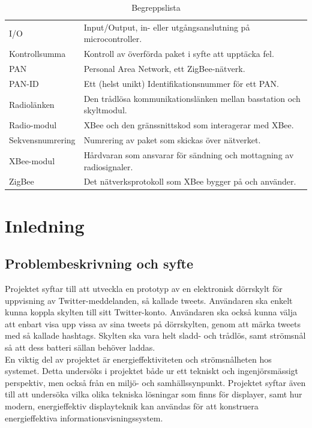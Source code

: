 \documentclass[a4paper,11pt]{article}
\begin{document}
\begin{table}[h]
\begin{tabular}{|l|l|}
I/O & Input/Output, in- eller utgångsanslutning på microcontroller.\\
Kontrollsumma & Kontroll av överförda paket i syfte att upptäcka fel.\\
PAN & Personal Area Network, ett ZigBee-nätverk.\\
PAN-ID & Ett (helst unikt) Identifikationsnummer för ett PAN.\\
Radiolänken & Den trådlösa kommunikationslänken mellan basstation och skyltmodul.\\
Radio-modul & XBee och den gränssnittskod som interagerar med XBee.\\
Sekvensnumrering & Numrering av paket som skickas över nätverket.\\
XBee-modul & Hårdvaran som ansvarar för sändning och mottagning av radiosignaler.\\
ZigBee & Det nätverksprotokoll som XBee bygger på och använder.\\
	\end{tabular}
\caption{Begreppslista}
\label{tab:begreppstable}
\end{table}

\thispagestyle{empty}
\pagebreak

\thispagestyle{empty}
\tableofcontents
\thispagestyle{empty}
\pagebreak

\setcounter{page}{1}
\section{Inledning}

\subsection{Problembeskrivning och syfte}
Projektet syftar till att utveckla en prototyp av en elektronisk dörrskylt för uppvisning av Twitter-meddelanden, så kallade tweets. Användaren ska enkelt kunna koppla skylten till sitt Twitter-konto. Användaren ska också kunna välja att enbart visa upp vissa av sina tweets på dörrskylten, genom att märka tweets med så kallade hashtags. Skylten ska vara helt sladd- och trådlös, samt strömsnål så att dess batteri sällan behöver laddas. \\

En viktig del av projektet är energieffektiviteten och strömsnålheten hos systemet. Detta undersöks i projektet både ur ett tekniskt och ingenjörsmässigt perspektiv, men också från en miljö- och samhällssynpunkt. Projektet syftar även till att undersöka vilka olika tekniska lösningar som finns för displayer, samt hur modern, energieffektiv displayteknik kan användas för att konstruera energieffektiva informationsvisningssystem. \\
\end{document}
